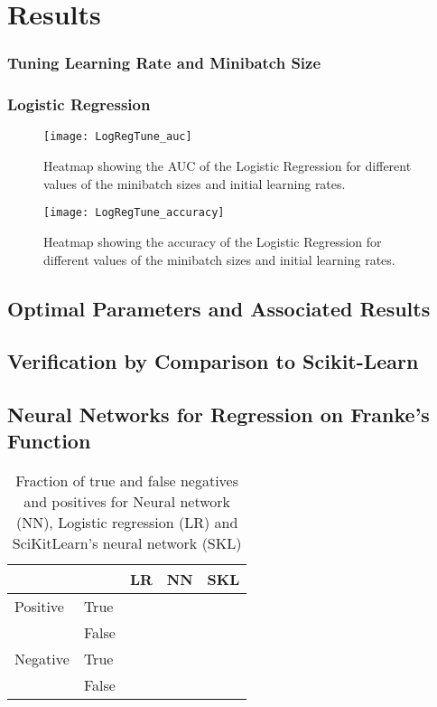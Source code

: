 \section{Results}
\label{sec:results}

\subsubsection{Tuning Learning Rate and Minibatch Size}
\subsubsection*{Logistic Regression}
\begin{figure}[htbp]
	\centering
	\texttt{[image: LogRegTune\_auc]}
	\caption{Heatmap showing the AUC of the Logistic Regression for different
    values of the minibatch sizes and initial learning rates.}
	\label{fig:TuneLogReg_auc}
\end{figure}

\begin{figure}[htbp]
	\centering
	\texttt{[image: LogRegTune\_accuracy]}
	\caption{Heatmap showing the accuracy of the Logistic Regression for different values of the minibatch sizes and initial learning rates.}
	\label{fig:TuneLogReg_accuracy}
\end{figure}


\subsection*{Optimal Parameters and Associated Results}

\subsection{Verification by Comparison to Scikit-Learn}

\subsection{Neural Networks for Regression on Franke's Function}


\begin{table}[htbp]

\caption{Fraction of true and false negatives and positives for Neural network (NN), Logistic regression (LR) and SciKitLearn's neural network (SKL)}
	\begin{tabular}{l  l  r  r  r}
		 & & \textbf{LR} & \textbf{NN} & \textbf{SKL} \\
		 \hline
		Positive & True & & & \\
		 & False &  & & \\
		 \hline
		Negative & True & &  & \\
		& False & & & \\
	\end{tabular}
\label{tab:confusion}
\end{table}

\begin{figure}[htbp]
	\centering
	\caption{}
	\label{fig:}
\end{figure}
